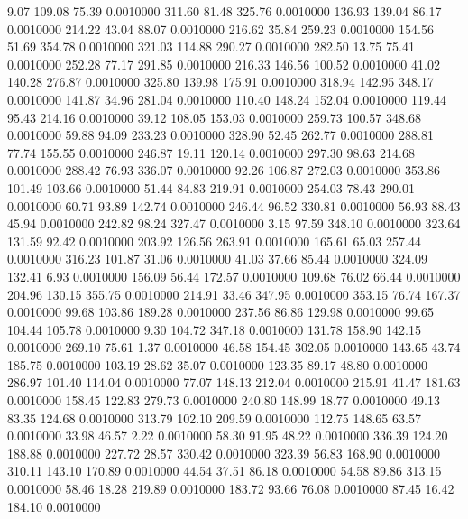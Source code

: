   9.07  109.08   75.39   0.0010000
 311.60   81.48  325.76   0.0010000
 136.93  139.04   86.17   0.0010000
 214.22   43.04   88.07   0.0010000
 216.62   35.84  259.23   0.0010000
 154.56   51.69  354.78   0.0010000
 321.03  114.88  290.27   0.0010000
 282.50   13.75   75.41   0.0010000
 252.28   77.17  291.85   0.0010000
 216.33  146.56  100.52   0.0010000
  41.02  140.28  276.87   0.0010000
 325.80  139.98  175.91   0.0010000
 318.94  142.95  348.17   0.0010000
 141.87   34.96  281.04   0.0010000
 110.40  148.24  152.04   0.0010000
 119.44   95.43  214.16   0.0010000
  39.12  108.05  153.03   0.0010000
 259.73  100.57  348.68   0.0010000
  59.88   94.09  233.23   0.0010000
 328.90   52.45  262.77   0.0010000
 288.81   77.74  155.55   0.0010000
 246.87   19.11  120.14   0.0010000
 297.30   98.63  214.68   0.0010000
 288.42   76.93  336.07   0.0010000
  92.26  106.87  272.03   0.0010000
 353.86  101.49  103.66   0.0010000
  51.44   84.83  219.91   0.0010000
 254.03   78.43  290.01   0.0010000
  60.71   93.89  142.74   0.0010000
 246.44   96.52  330.81   0.0010000
  56.93   88.43   45.94   0.0010000
 242.82   98.24  327.47   0.0010000
   3.15   97.59  348.10   0.0010000
 323.64  131.59   92.42   0.0010000
 203.92  126.56  263.91   0.0010000
 165.61   65.03  257.44   0.0010000
 316.23  101.87   31.06   0.0010000
  41.03   37.66   85.44   0.0010000
 324.09  132.41    6.93   0.0010000
 156.09   56.44  172.57   0.0010000
 109.68   76.02   66.44   0.0010000
 204.96  130.15  355.75   0.0010000
 214.91   33.46  347.95   0.0010000
 353.15   76.74  167.37   0.0010000
  99.68  103.86  189.28   0.0010000
 237.56   86.86  129.98   0.0010000
  99.65  104.44  105.78   0.0010000
   9.30  104.72  347.18   0.0010000
 131.78  158.90  142.15   0.0010000
 269.10   75.61    1.37   0.0010000
  46.58  154.45  302.05   0.0010000
 143.65   43.74  185.75   0.0010000
 103.19   28.62   35.07   0.0010000
 123.35   89.17   48.80   0.0010000
 286.97  101.40  114.04   0.0010000
  77.07  148.13  212.04   0.0010000
 215.91   41.47  181.63   0.0010000
 158.45  122.83  279.73   0.0010000
 240.80  148.99   18.77   0.0010000
  49.13   83.35  124.68   0.0010000
 313.79  102.10  209.59   0.0010000
 112.75  148.65   63.57   0.0010000
  33.98   46.57    2.22   0.0010000
  58.30   91.95   48.22   0.0010000
 336.39  124.20  188.88   0.0010000
 227.72   28.57  330.42   0.0010000
 323.39   56.83  168.90   0.0010000
 310.11  143.10  170.89   0.0010000
  44.54   37.51   86.18   0.0010000
  54.58   89.86  313.15   0.0010000
  58.46   18.28  219.89   0.0010000
 183.72   93.66   76.08   0.0010000
  87.45   16.42  184.10   0.0010000
